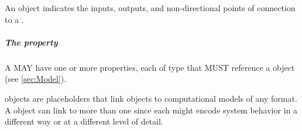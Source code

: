 An  object indicates the inputs, outputs, and non-directional points of connection to a .

\subparagraph{The  property}\label{sec:hasModel}

A  MAY have one or more  properties, each of type  that MUST reference a  object (see \ref{sec:Model}).  

 objects are placeholders that link  objects to computational models of any format.
A  object can link to more than one  since each might encode system behavior in a different way or at a different level of detail.














